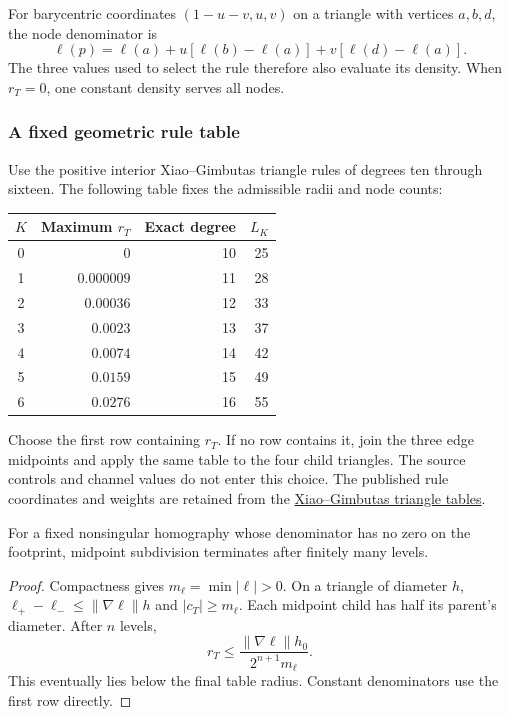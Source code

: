 For barycentric coordinates $(1-u-v,u,v)$ on a triangle with vertices
$a,b,d$, the node denominator is
\begin{equation}
 \ell(p)=\ell(a)+u[\ell(b)-\ell(a)]+v[\ell(d)-\ell(a)].
 \label{eq:stardenominatorreuse}
\end{equation}
The three values used to select the rule therefore also evaluate its density.
When $r_T=0$, one constant density serves all nodes.

\subsubsection{A fixed geometric rule table}
Use the positive interior Xiao--Gimbutas triangle rules of degrees ten through
sixteen. The following table fixes the admissible radii and node counts:
\begin{center}
\small
\begin{tabular}{c r r r}
$K$ & Maximum $r_T$ & Exact degree & $L_K$ \\
\hline
0 & $0$ & 10 & 25 \\
1 & $0.000009$ & 11 & 28 \\
2 & $0.00036$ & 12 & 33 \\
3 & $0.0023$ & 13 & 37 \\
4 & $0.0074$ & 14 & 42 \\
5 & $0.0159$ & 15 & 49 \\
6 & $0.0276$ & 16 & 55
\end{tabular}
\end{center}
Choose the first row containing $r_T$. If no row contains it, join the three
edge midpoints and apply the same table to the four child triangles.
The source controls and channel values do not enter this choice. The
published rule coordinates and weights are retained from the
\href{https://github.com/zgimbutas/triasymq/tree/25a42d3287118cd9064b57de457947fb937691a9}
{Xiao--Gimbutas triangle tables}.

\begin{proposition}
For a fixed nonsingular homography whose denominator has no zero on the
footprint, midpoint subdivision terminates after finitely many levels.
\end{proposition}
\begin{proof}
Compactness gives $m_\ell=\min|\ell|>0$. On a triangle of diameter $h$,
$\ell_+-\ell_-\leq\|\nabla\ell\|h$ and $|c_T|\geq m_\ell$.
Each midpoint child has half its parent's diameter. After $n$ levels,
\begin{equation}
 r_T\leq\frac{\|\nabla\ell\|h_0}{2^{n+1}m_\ell}.
\end{equation}
This eventually lies below the final table radius. Constant denominators
use the first row directly.
\end{proof}

